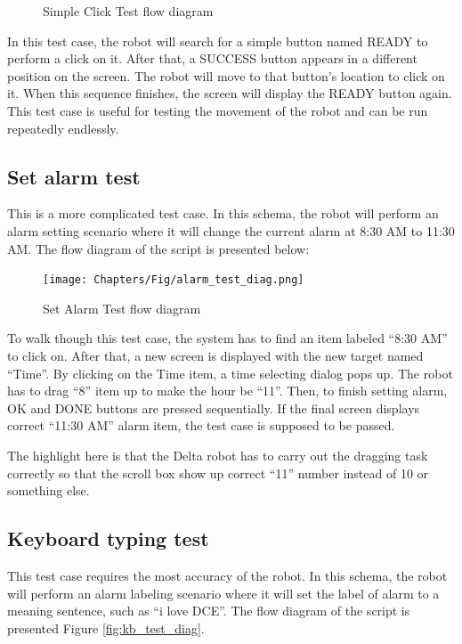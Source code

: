 \begin{figure}[H]
		\caption{Simple Click Test flow diagram}
		\label{fig:click_test_diag}
	\end{figure}

In this test case, the robot will search for a simple button named READY to perform a click on it. After that, a SUCCESS button appears in a different position on the screen. The robot will move to that button's location to click on it. When this sequence finishes, the screen will display the READY button again.
This test case is useful for testing the movement of the robot and can be run repeatedly endlessly.

\subsection{Set alarm test}
This is a more complicated test case. In this schema, the robot will perform an alarm setting scenario where it will change the current alarm at 8:30 AM to 11:30 AM. The flow diagram of the script is presented below:

	\begin{figure}[H]
		\centering
		\texttt{[image: Chapters/Fig/alarm\_test\_diag.png]}
		\caption{Set Alarm Test flow diagram}
		\label{fig:alarm_test_diag}
	\end{figure}

To walk though this test case, the system has to find an item labeled ``8:30 AM'' to click on. After that, a new screen is displayed with the new target named ``Time''. By clicking on the Time item, a time selecting dialog pops up. The robot has to drag ``8'' item up to make the hour be ``11''. Then, to finish setting alarm, OK and DONE buttons are pressed sequentially. If the final screen displays correct ``11:30 AM'' alarm item, the test case is supposed to be passed.

The highlight here is that the Delta robot has to carry out the dragging task correctly so that the scroll box show up correct ``11'' number instead of 10 or something else.

\subsection{Keyboard typing test}
This test case requires the most accuracy of the robot. In this schema, the robot will perform an alarm labeling scenario where it will set the label of alarm to a meaning sentence, such as ``i love DCE''. The flow diagram of the script is presented Figure \ref{fig:kb_test_diag}.

